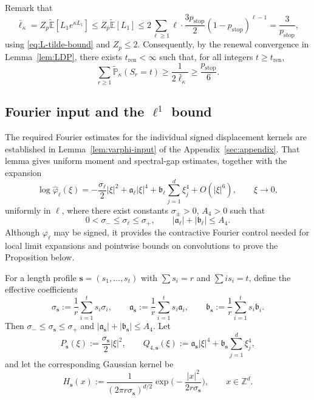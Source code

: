 \documentclass[letterpaper,11pt,reqno]{amsart}
\theoremstyle{definition}
\newcommand{\abs}[1]{\left\vert#1\right\vert}
\newcommand{\vs}{\mathbf{s}}\newcommand{\vt}{\mathbf{t}}\newcommand{\vu}{\mathbf{u}}
\begin{document}
Remark that
\[
\bar\ell_\kappa
=
Z_p\tilde{\mathbb E}[L_1e^{\kappa L_1}]
\le
Z_p\tilde{\mathbb E}[L_1]
\le
2\sum_{\ell\ge1}\ell\cdot \frac{3p_{\mathrm{stop}}}{2}(1-p_{\mathrm{stop}})^{\ell-1}
=
\frac{3}{p_{\mathrm{stop}}},
\]
using \eqref{eq:L-tilde-bound} and \(Z_p\le2\). 
Consequently, by the renewal convergence in Lemma~\ref{lem:LDP}, there exists
\(t_{\mathrm{ren}}<\infty\) such that, for all integers \(t\ge t_{\mathrm{ren}}\),
\begin{equation}\label{eq:renewal-lb-ps}
\sum_{r\ge1}\tilde{\mathbb P}_\kappa(S_r=t)
\ge \frac{1}{2\bar\ell_\kappa}
\ge \frac{p_{\mathrm{stop}}}{6}.
\end{equation}


\subsection{Fourier input and the \texorpdfstring{\(\ell^1\)}{l1} bound}
\label{subsec:fourier-input}

The required Fourier estimates for the individual signed displacement
kernels are established in Lemma~\ref{lem:varphi-input} of the
Appendix~\ref{sec:appendix}. That lemma gives uniform moment
and spectral-gap estimates, together with the expansion
\[
\log \widehat\varphi_\ell(\xi)
=
-\frac{\sigma_\ell}{2}|\xi|^2
+\mathfrak a_\ell|\xi|^4
+\mathfrak b_\ell\sum_{j=1}^d\xi_j^4
+O(|\xi|^6),
\qquad \xi\to0,
\]
uniformly in \(\ell\), where there exist constants
$\sigma_\pm>0$, $A_4>0$ such that 
\[
0<\sigma_-\le \sigma_\ell\le\sigma_+,
\qquad
|\mathfrak a_\ell|+|\mathfrak b_\ell|\le A_4.
\]
Although $\varphi_\ell$ may be signed, it provides the contractive Fourier control
needed for local limit expansions and pointwise bounds on convolutions to prove the Proposition below.


\smallskip
For a length profile $\vs=(s_1,\ldots,s_t)$ with $\sum s_i=r$ and $\sum i s_i=t$, define the effective coefficients
\begin{equation*}
\sigma_\vs:=\frac1r\sum_{i=1}^t s_i\sigma_i,\qquad
\mathfrak{a}_\vs:=\frac1r\sum_{i=1}^t s_i\mathfrak{a}_i,\qquad
\mathfrak{b}_\vs:=\frac1r\sum_{i=1}^t s_i\mathfrak{b}_i.
\end{equation*}
Then $\sigma_-\le \sigma_{\vs}\le \sigma_+$ and $\abs{\mathfrak{a}_{\vs}}+\abs{\mathfrak{b}_{\vs}}\le A_4$. Let
\begin{equation*}
P_{\vs}(\xi):=\frac{\sigma_{\vs}}{2}\abs{\xi}^2,
\qquad
Q_{4,\vs}(\xi)
:=\mathfrak{a}_\vs|\xi|^4+\mathfrak{b}_\vs\sum_{j=1}^d \xi_j^4,
\end{equation*}
and let the corresponding Gaussian kernel be
\begin{equation*}
H_{\vs}(x)
:=\frac{1}{(2\pi r\sigma_\vs)^{d/2}}
\exp\!\Big(-\frac{|x|^2}{2r\sigma_\vs}\Big),
\qquad x\in\mathbb{Z}^d.
\end{equation*}
\end{document}
